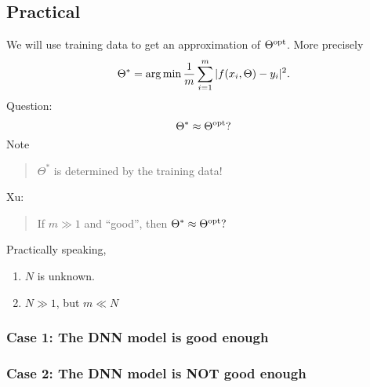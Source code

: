 \subsection{Practical}
We will use training data to get an approximation of $\Theta^{\rm opt}$.  More precisely
$$
\Theta^*=\arg\min {1\over m}\sum_{i=1}^m|f(x_i,\Theta)-y_i|^2.
$$
Question:
$$
\Theta^*\approx \Theta^{\rm opt}?
$$
Note
\begin{quote}
  $\Theta^*$ is determined by the training data!
\end{quote}

Xu:

\begin{quote}
If  $m\gg 1$ and ``good'', then $\Theta^*\approx \Theta^{\rm opt}?$
\end{quote}
Practically speaking,  
\begin{enumerate}
\item $N$ is unknown.
\item $N\gg 1$, but $m\ll N$
\end{enumerate}

\subsubsection{Case 1:  The DNN model is good enough}

\subsubsection{Case 2:  The DNN model is  NOT good enough}
